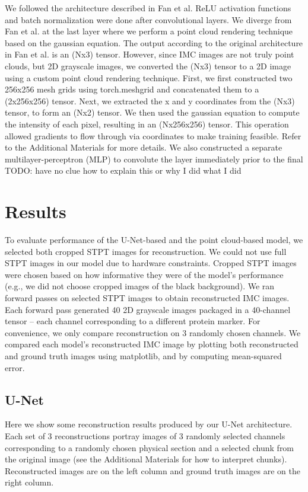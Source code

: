 \documentclass[10pt,twocolumn,letterpaper]{article}
\begin{document}
We followed the architecture described in Fan et al. ReLU activation functions and batch normalization were done after convolutional layers. We diverge from Fan et al. at the last layer where we perform a point cloud rendering technique based on the gaussian equation. The output according to the original architecture in Fan et al. is an (Nx3) tensor. However, since IMC images are not truly point clouds, but 2D grayscale images, we converted the (Nx3) tensor to a 2D image using a custom point cloud rendering technique. First, we first constructed two 256x256 mesh grids using torch.meshgrid and concatenated them to a (2x256x256) tensor. Next, we extracted the x and y coordinates from the (Nx3) tensor, to form an (Nx2) tensor. We then used the gaussian equation to compute the intensity of each pixel, resulting in an (Nx256x256) tensor. This operation allowed gradients to flow through via coordinates to make training feasible. Refer to the Additional Materials for more details. We also constructed a separate multilayer-perceptron (MLP) to convolute the layer immediately prior to the final TODO: have no clue how to explain this or why I did what I did

\section{Results}

To evaluate performance of the U-Net-based and the point cloud-based model, we selected both cropped STPT images for reconstruction. We could not use full STPT images in our model due to hardware constraints. Cropped STPT images were chosen based on how informative they were of the model’s performance (e.g., we did not choose cropped images of the black background). We ran forward passes on selected STPT images to obtain reconstructed IMC images. Each forward pass generated 40 2D grayscale images packaged in a 40-channel tensor – each channel corresponding to a different protein marker. For convenience, we only compare reconstruction on 3 randomly chosen channels. We compared each model’s reconstructed IMC image by plotting both reconstructed and ground truth images using matplotlib, and by computing mean-squared error.


\subsection{U-Net}
Here we show some reconstruction results produced by our U-Net architecture. Each set of 3 reconstructions portray images of 3 randomly selected channels corresponding to a randomly chosen physical section and a selected chunk from the original image (see the Additional Materials for how to interpret chunks). Reconstructed images are on the left column and ground truth images are on the right column. 
\end{document}
